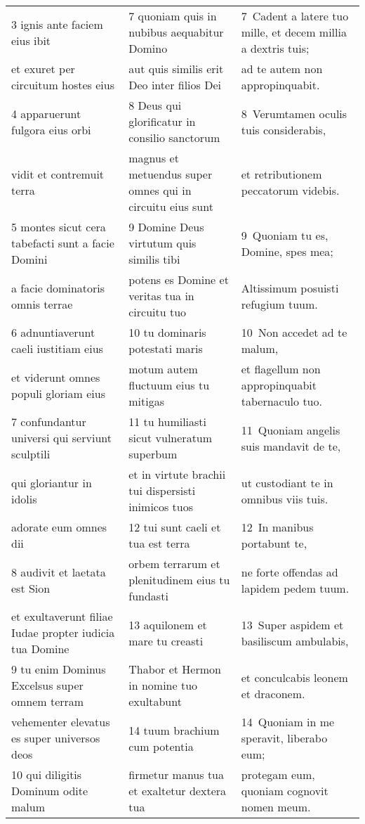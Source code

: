 \documentclass{article}
\begin{document}
\begin{longtable}{@{}p{}p{}p{}@{}}
3 ignis ante faciem eius ibit	&	7 quoniam quis in nubibus aequabitur Domino	&	7 Cadent a latere tuo mille, et decem millia a dextris tuis;	\\
et exuret per circuitum hostes eius	&	aut quis similis erit Deo inter filios Dei	&	ad te autem non appropinquabit.	\\
4 apparuerunt fulgora eius orbi	&	8 Deus qui glorificatur in consilio sanctorum	&	8 Verumtamen oculis tuis considerabis,	\\
vidit et contremuit terra	&	magnus et metuendus super omnes qui in circuitu eius sunt	&	et retributionem peccatorum videbis.	\\
5 montes sicut cera tabefacti sunt a facie Domini	&	9 Domine Deus virtutum quis similis tibi	&	9 Quoniam tu es, Domine, spes mea;	\\
a facie dominatoris omnis terrae	&	potens es Domine et veritas tua in circuitu tuo	&	Altissimum posuisti refugium tuum.	\\
6 adnuntiaverunt caeli iustitiam eius	&	10 tu dominaris potestati maris	&	10 Non accedet ad te malum,	\\
et viderunt omnes populi gloriam eius	&	motum autem fluctuum eius tu mitigas	&	et flagellum non appropinquabit tabernaculo tuo.	\\
7 confundantur universi qui serviunt sculptili	&	11 tu humiliasti sicut vulneratum superbum	&	11 Quoniam angelis suis mandavit de te,	\\
qui gloriantur in idolis	&	et in virtute brachii tui dispersisti inimicos tuos	&	ut custodiant te in omnibus viis tuis.	\\
adorate eum omnes dii	&	12 tui sunt caeli et tua est terra	&	12 In manibus portabunt te,	\\
8 audivit et laetata est Sion	&	orbem terrarum et plenitudinem eius tu fundasti	&	ne forte offendas ad lapidem pedem tuum.	\\
et exultaverunt filiae Iudae propter iudicia tua Domine	&	13 aquilonem et mare tu creasti	&	13 Super aspidem et basiliscum ambulabis,	\\
9 tu enim Dominus Excelsus super omnem terram	&	Thabor et Hermon in nomine tuo exultabunt	&	et conculcabis leonem et draconem.	\\
vehementer elevatus es super universos deos	&	14 tuum brachium cum potentia	&	14 Quoniam in me speravit, liberabo eum;	\\
10 qui diligitis Dominum odite malum	&	firmetur manus tua et exaltetur dextera tua	&	protegam eum, quoniam cognovit nomen meum.	\\

\end{longtable}
\end{document}
